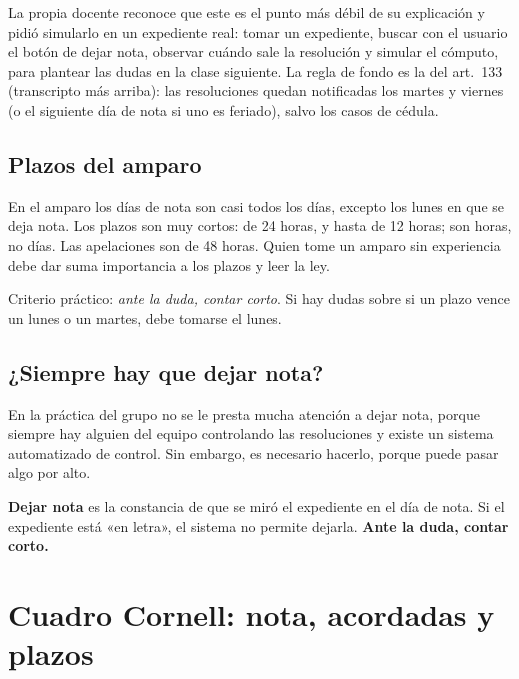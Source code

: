 \documentclass[12pt,oneside]{book}
\begin{document}
\begin{note}
La propia docente reconoce que este es el punto más débil de su explicación y pidió simularlo en un expediente real: tomar un expediente, buscar con el usuario el botón de dejar nota, observar cuándo sale la resolución y simular el cómputo, para plantear las dudas en la clase siguiente. La regla de fondo es la del art.\ 133 (transcripto más arriba): las resoluciones quedan notificadas los martes y viernes (o el siguiente día de nota si uno es feriado), salvo los casos de cédula.
\end{note}

\subsection{Plazos del amparo}

En el amparo los días de nota son casi todos los días, excepto los lunes en que se deja nota. Los plazos son muy cortos: de 24 horas, y hasta de 12 horas; son horas, no días. Las apelaciones son de 48 horas. Quien tome un amparo sin experiencia debe dar suma importancia a los plazos y leer la ley.

Criterio práctico: \textit{ante la duda, contar corto}. Si hay dudas sobre si un plazo vence un lunes o un martes, debe tomarse el lunes.

\subsection{¿Siempre hay que dejar nota?}

En la práctica del grupo no se le presta mucha atención a dejar nota, porque siempre hay alguien del equipo controlando las resoluciones y existe un sistema automatizado de control. Sin embargo, es necesario hacerlo, porque puede pasar algo por alto.

\begin{important}
\textbf{Dejar nota} es la constancia de que se miró el expediente en el día de nota. Si el expediente está «en letra», el sistema no permite dejarla. \textbf{Ante la duda, contar corto.}
\end{important}

\section{Cuadro Cornell: nota, acordadas y plazos}
\end{document}
